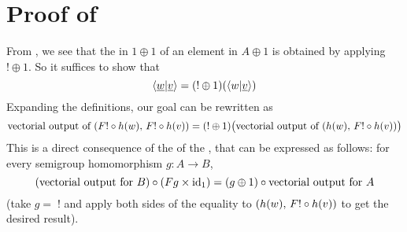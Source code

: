 \section{Proof of }

From , we see that the  in $1 \oplus 1$ of an element in $A \oplus 1$ is obtained by applying $!\oplus1$. So it suffices to show that
\[\langle \underline{w}|\underline{v} \rangle = (!\oplus1)(\langle w|\underline{v} \rangle) \]
Expanding the definitions, our goal can be rewritten as
\[ \text{vectorial output of}\ (\functor! \circ h(w),\, \functor! \circ h(v)) = (!\oplus1)\big(\text{vectorial output of}\ (h(w),\, \functor! \circ h(v))\big) \]
This is a direct consequence of the  of the , that can be expressed as follows: for every semigroup homomorphism $g\colon A \to B$,
\[ (\text{vectorial output for $B$}) \circ (\functor g \times \mathrm{id}_1) = (g\oplus1) \circ \text{vectorial output for $A$} \]
(take $g=\;!$ and apply both sides of the equality to $(h(w),\, \functor! \circ h(v))$ to get the desired result).